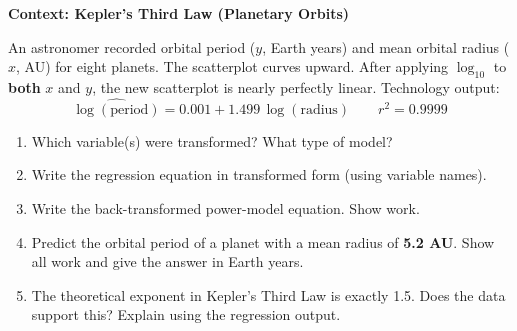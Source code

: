 \documentclass[10pt]{article}
\begin{document}
\vspace{0.12in}

\begin{tcolorbox}[colback=white, colframe=black!40, boxrule=0.8pt, arc=2mm,
    left=4mm, right=4mm, top=3mm, bottom=3mm,
    title={\textbf{Tier A --- Approaching Proficiency}}, fonttitle=\bfseries, halign title=center]
\small

\textbf{Context: Kepler's Third Law (Planetary Orbits)}

An astronomer recorded orbital period ($y$, Earth years) and mean orbital radius ($x$,
AU) for eight planets. The scatterplot curves upward. After applying $\log_{10}$ to
\textbf{both} $x$ and $y$, the new scatterplot is nearly perfectly linear. Technology output:
\[
  \widehat{\log(\text{period})} = 0.001 + 1.499\,\log(\text{radius}) \qquad r^2 = 0.9999
\]

\vspace{8pt}

\begin{enumerate}[leftmargin=1.6em, itemsep=0.18in]

  \item Which variable(s) were transformed?  \quad
        What type of model? 

  \item Write the regression equation in transformed form (using variable names).\\[6pt]

  \item Write the back-transformed power-model equation. Show work.\\[8pt]

  \item Predict the orbital period of a planet with a mean radius of \textbf{5.2 AU}.
        Show all work and give the answer in Earth years.\\[8pt]

  \item The theoretical exponent in Kepler's Third Law is exactly 1.5. Does the data
        support this? Explain using the regression output.\\[8pt]

\end{enumerate}
\end{tcolorbox}
\end{document}
